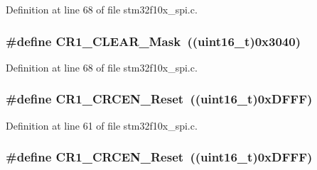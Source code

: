 Definition at line 68 of file stm32f10x\+\_\+spi.\+c.

\subsubsection[{\texorpdfstring{C\+R1\+\_\+\+C\+L\+E\+A\+R\+\_\+\+Mask}{CR1_CLEAR_Mask}}]{\setlength{\rightskip}{0pt plus 5cm}\#define C\+R1\+\_\+\+C\+L\+E\+A\+R\+\_\+\+Mask~(({\bf uint16\+\_\+t})0x3040)}\hypertarget{group___s_p_i___private___defines_ga67f7dd35ea3d1296677e5fc50b88fa90}{}\label{group___s_p_i___private___defines_ga67f7dd35ea3d1296677e5fc50b88fa90}


Definition at line 68 of file stm32f10x\+\_\+spi.\+c.

\subsubsection[{\texorpdfstring{C\+R1\+\_\+\+C\+R\+C\+E\+N\+\_\+\+Reset}{CR1_CRCEN_Reset}}]{\setlength{\rightskip}{0pt plus 5cm}\#define C\+R1\+\_\+\+C\+R\+C\+E\+N\+\_\+\+Reset~(({\bf uint16\+\_\+t})0x\+D\+F\+F\+F)}\hypertarget{group___s_p_i___private___defines_gadd72ac04e7b2ff17053db04d240e17b1}{}\label{group___s_p_i___private___defines_gadd72ac04e7b2ff17053db04d240e17b1}


Definition at line 61 of file stm32f10x\+\_\+spi.\+c.

\subsubsection[{\texorpdfstring{C\+R1\+\_\+\+C\+R\+C\+E\+N\+\_\+\+Reset}{CR1_CRCEN_Reset}}]{\setlength{\rightskip}{0pt plus 5cm}\#define C\+R1\+\_\+\+C\+R\+C\+E\+N\+\_\+\+Reset~(({\bf uint16\+\_\+t})0x\+D\+F\+F\+F)}\hypertarget{group___s_p_i___private___defines_gadd72ac04e7b2ff17053db04d240e17b1}{}\label{group___s_p_i___private___defines_gadd72ac04e7b2ff17053db04d240e17b1}


